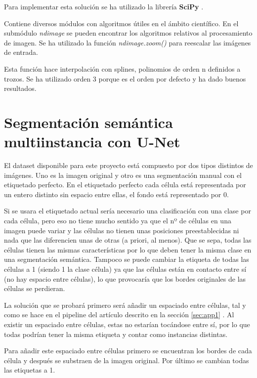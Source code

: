 Para implementar esta solución se ha utilizado la librería \textbf{SciPy} \cite{Virtanen2020}. 

Contiene diversos módulos con algoritmos útiles en el ámbito científico. En el submódulo \textit{ndimage} se pueden encontrar los algoritmos relativos al procesamiento de imagen. Se ha utilizado la función \textit{ndimage.zoom()} para reescalar las imágenes de entrada.

Esta función hace interpolación con splines, polinomios de orden n definidos a trozos. Se ha utilizado orden 3 porque es el orden por defecto y ha dado buenos resultados.

\section{Segmentación semántica multiinstancia con U-Net}\label{sec:multiinstance_segm}

El dataset disponible para este proyecto está compuesto por dos tipos distintos de imágenes. Uno es la imagen original y otro es una segmentación manual con el etiquetado perfecto. En el etiquetado perfecto cada célula está representada por un entero distinto sin espacio entre ellas, el fondo está representado por 0.

Si se usara el etiquetado actual sería necesario una clasificación con una clase por cada célula, pero eso no tiene mucho sentido ya que el nº de células en una imagen puede variar y las células no tienen unas posiciones preestablecidas ni nada que las diferencien unas de otras (a priori, al menos). Que se sepa, todas las células tienen las mismas características por lo que deben tener la misma clase en una segmentación semántica. Tampoco se puede cambiar la etiqueta de todas las células a 1 (siendo 1 la clase célula) ya que las células están en contacto entre sí (no hay espacio entre células), lo que provocaría que los bordes originales de las células se perdieran.

La solución que se probará primero será añadir un espaciado entre células, tal y como se hace en el pipeline del artículo descrito en la sección \ref{sec:app1} \cite{Falk2019}. Al existir un espaciado entre células, estas no estarían tocándose entre sí, por lo que todas podrían tener la misma etiqueta y contar como instancias distintas.

Para añadir este espaciado entre células primero se encuentran los bordes de cada célula y después se substraen de la imagen original. Por último se cambian todas las etiquetas a 1.

